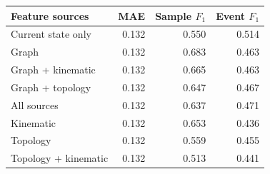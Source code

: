 \begin{tabular}{lrrr}
\toprule
Feature sources & MAE & Sample $F_1$ & Event $F_1$ \\
\midrule
Current state only & 0.132 & 0.550 & 0.514 \\
Graph & 0.132 & 0.683 & 0.463 \\
Graph + kinematic & 0.132 & 0.665 & 0.463 \\
Graph + topology & 0.132 & 0.647 & 0.467 \\
All sources & 0.132 & 0.637 & 0.471 \\
Kinematic & 0.132 & 0.653 & 0.436 \\
Topology & 0.132 & 0.559 & 0.455 \\
Topology + kinematic & 0.132 & 0.513 & 0.441 \\
\bottomrule
\end{tabular}
